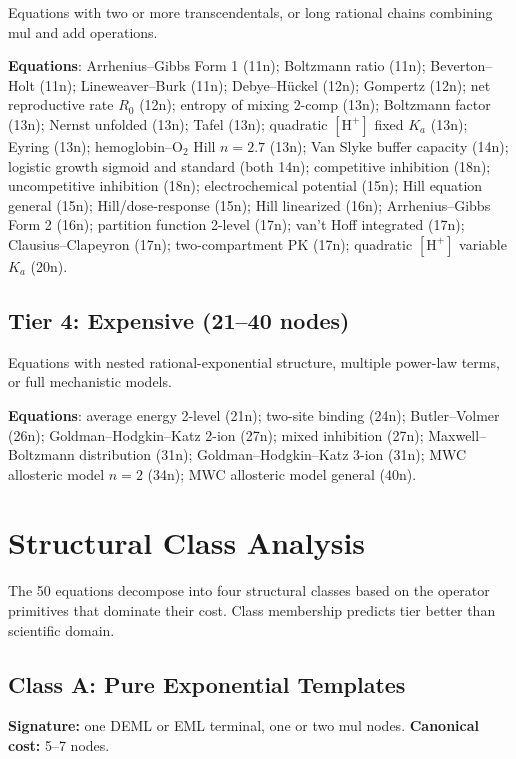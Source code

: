 \documentclass[12pt,a4paper]{article}
\theoremstyle{definition}
\begin{document}
Equations with two or more transcendentals, or long rational chains
combining mul and add operations.

\textbf{Equations}: Arrhenius--Gibbs Form 1 (11n);
Boltzmann ratio (11n); Beverton--Holt (11n); Lineweaver--Burk (11n);
Debye--H\"{u}ckel (12n); Gompertz (12n); net reproductive rate $R_0$ (12n);
entropy of mixing 2-comp (13n); Boltzmann factor (13n);
Nernst unfolded (13n); Tafel (13n); quadratic $[\mathrm{H}^+]$ fixed $K_a$ (13n);
Eyring (13n); hemoglobin--O$_2$ Hill $n=2.7$ (13n);
Van Slyke buffer capacity (14n);
logistic growth sigmoid and standard (both 14n);
competitive inhibition (18n); uncompetitive inhibition (18n);
electrochemical potential (15n); Hill equation general (15n);
Hill/dose-response (15n); Hill linearized (16n);
Arrhenius--Gibbs Form 2 (16n); partition function 2-level (17n);
van't Hoff integrated (17n); Clausius--Clapeyron (17n);
two-compartment PK (17n); quadratic $[\mathrm{H}^+]$ variable $K_a$ (20n).

\subsection*{Tier 4: Expensive (21--40 nodes)}

Equations with nested rational-exponential structure, multiple power-law
terms, or full mechanistic models.

\textbf{Equations}: average energy 2-level (21n);
two-site binding (24n); Butler--Volmer (26n);
Goldman--Hodgkin--Katz 2-ion (27n); mixed inhibition (27n);
Maxwell--Boltzmann distribution (31n);
Goldman--Hodgkin--Katz 3-ion (31n);
MWC allosteric model $n=2$ (34n);
MWC allosteric model general (40n).

\section{Structural Class Analysis}
\label{sec:classes}

The 50 equations decompose into four structural classes based on the
operator primitives that dominate their cost.  Class membership predicts
tier better than scientific domain.

\subsection{Class A: Pure Exponential Templates}

\textbf{Signature:} one DEML or EML terminal, one or two mul nodes.
\textbf{Canonical cost:} 5--7 nodes.
\end{document}
